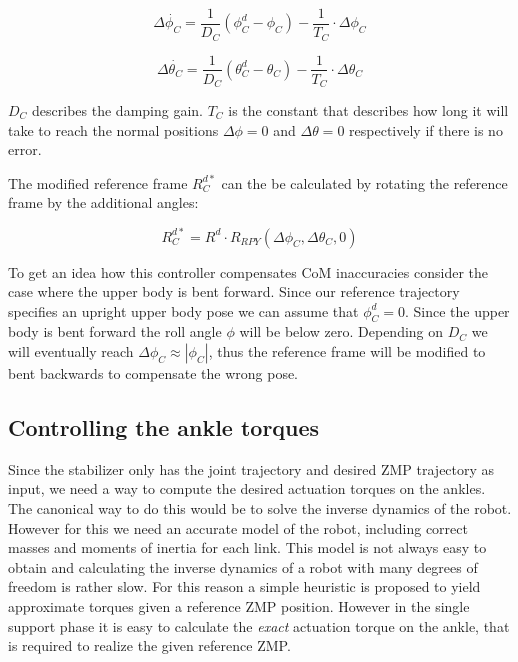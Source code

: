 \documentclass[english,ngerman]{KITreprt}
\begin{document}
\begin{equation} \label{eq:chest-dampening-roll}
\Delta \dot{\phi_C} = \frac{1}{D_C} (\phi_C^d - \phi_C) - \frac{1}{T_C} \cdot \Delta \phi_C
\end{equation}

\begin{equation} \label{eq:chest-dampening-pitch}
\Delta \dot{\theta_C} = \frac{1}{D_C} (\theta_C^d - \theta_C) - \frac{1}{T_C} \cdot \Delta \theta_C
\end{equation}

$D_C$ describes the damping gain. $T_C$ is the constant that describes
how long it will take to reach the normal positions $\Delta \phi = 0$
and $\Delta \theta = 0$ respectively if there is no error.

The modified reference frame $R^{d*}_C$ can the be calculated by
rotating the reference frame by the additional angles:

\begin{equation}
R^{d*}_C = R^d \cdot R_{RPY}(\Delta \phi_C, \Delta \theta_C, 0)
\end{equation}

To get an idea how this controller compensates CoM inaccuracies consider
the case where the upper body is bent forward. Since our reference
trajectory specifies an upright upper body pose we can assume that
$\phi_C^d = 0$. Since the upper body is bent forward the roll angle
$\phi$ will be below zero. Depending on $D_C$ we will eventually reach
$\Delta \phi_C \approx |\phi_C|$, thus the reference frame will be
modified to bent backwards to compensate the wrong pose.

\subsection{Controlling the ankle
torques}\label{controlling-the-ankle-torques}

Since the stabilizer only has the joint trajectory and desired ZMP
trajectory as input, we need a way to compute the desired actuation
torques on the ankles. The canonical way to do this would be to solve
the inverse dynamics of the robot. However for this we need an accurate
model of the robot, including correct masses and moments of inertia for
each link. This model is not always easy to obtain and calculating the
inverse dynamics of a robot with many degrees of freedom is rather slow.
For this reason a simple heuristic is proposed to yield approximate
torques given a reference ZMP position. However in the single support
phase it is easy to calculate the \emph{exact} actuation torque on the
ankle, that is required to realize the given reference ZMP.
\end{document}
